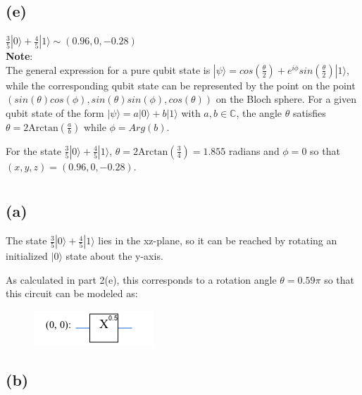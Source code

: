 \documentclass{article}
\begin{document}
\subsection*{(e)}

$
\frac{3}{5}|0\rangle+\frac{4}{5}|1\rangle\sim \boxed{(0.96,0,-0.28)}$\\

\textbf{Note}:\\
The general expression for a pure qubit state is $|\psi\rangle=cos(\frac{\theta}{2})+e^{i\phi}sin(\frac{\theta}{2})|1\rangle$, while the corresponding qubit state can be represented by the point on the point $(sin(\theta)cos(\phi),sin(\theta)sin(\phi),cos(\theta))$ on the Bloch sphere. For a given qubit state of the form $|\psi\rangle=a|0\rangle+b|1\rangle$ with $a,b\in\mathbb{C}$, the angle $\theta$ satisfies $\theta=2\text{Arctan}(\frac{a}{b})$ while $\phi=Arg(b)$.

For the state $\frac{3}{5}|0\rangle+\frac{4}{5}|1\rangle$,  $\theta=2\text{Arctan}(\frac{3}{4})=1.855$ radians and $\phi=0$ so that $(x,y,z)=(0.96,0,-0.28)$.

\section{}

\subsection*{(a)}

The state $\frac{3}{5}|0\rangle+\frac{4}{5}|1\rangle$ lies in the xz-plane, so it can be reached by rotating an initialized $|0\rangle$ state about the y-axis.

As calculated in part 2(e), this corresponds to a rotation angle $\theta=0.59\pi$ so that this circuit can be modeled as:

\begin{figure}[H]
  \centering
  \includegraphics[width=0.4\linewidth]
  {images/circuit_a.png}
\end{figure}

\subsection*{(b)}
\end{document}
